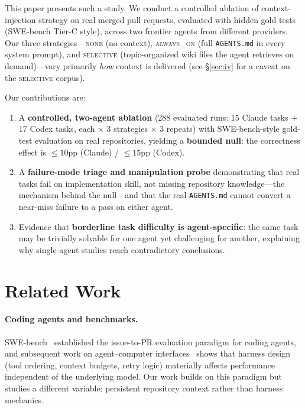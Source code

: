 \documentclass[11pt]{article}
\newcommand{\agentsmd}{\texttt{AGENTS.md}}
\newcommand{\none}{\textsc{none}}
\newcommand{\alwayson}{\textsc{always\_on}}
\newcommand{\selective}{\textsc{selective}}
\begin{document}
This paper presents such a study.
We conduct a controlled ablation of context-injection strategy on real merged pull requests, evaluated with hidden gold tests (SWE-bench Tier-C style), across two frontier agents from different providers.
Our three strategies---\none{} (no context), \alwayson{} (full \agentsmd{} in every system prompt), and \selective{} (topic-organized wiki files the agent retrieves on demand)---vary primarily \emph{how} context is delivered (see \S\ref{sec:iv} for a caveat on the \selective{} corpus).

Our contributions are:
\begin{enumerate}
    \item A \textbf{controlled, two-agent ablation} (288 evaluated runs: 15 Claude tasks + 17 Codex tasks, each $\times$ 3 strategies $\times$ 3 repeats) with SWE-bench-style gold-test evaluation on real repositories, yielding a \textbf{bounded null}: the correctness effect is ${\leq}10$pp (Claude) / ${\leq}15$pp (Codex).
    \item A \textbf{failure-mode triage and manipulation probe} demonstrating that real tasks fail on implementation skill, not missing repository knowledge---the mechanism behind the null---and that the real \agentsmd{} cannot convert a near-miss failure to a pass on either agent.
    \item Evidence that \textbf{borderline task difficulty is agent-specific}: the same task may be trivially solvable for one agent yet challenging for another, explaining why single-agent studies reach contradictory conclusions.
\end{enumerate}

\section{Related Work}

\paragraph{Coding agents and benchmarks.}
SWE-bench~\citep{swebench} established the issue-to-PR evaluation paradigm for coding agents, and subsequent work on agent--computer interfaces~\citep{sweagent} shows that harness design (tool ordering, context budgets, retry logic) materially affects performance independent of the underlying model.
Our work builds on this paradigm but studies a different variable: persistent repository context rather than harness mechanics.
\end{document}
